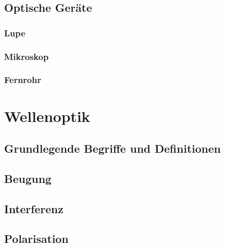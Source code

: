 \documentclass{article}
\begin{document}
\newpage


\subsection{Optische Geräte}
\subsubsection{Lupe}
\subsubsection{Mikroskop}
\subsubsection{Fernrohr}


\newpage


\section{Wellenoptik}
\subsection{Grundlegende Begriffe und Definitionen}
\subsection{Beugung}
\subsection{Interferenz}
\subsection{Polarisation}



\newpage
\end{document}
